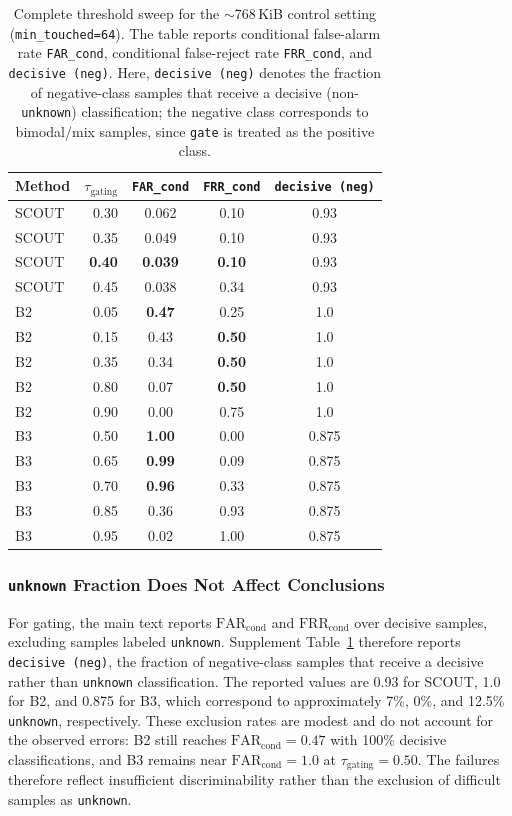 \begin{table}[!thbp]
\centering
\small
\begin{tabular}{lrccc}
\toprule
Method & $\tau_{\text{gating}}$ & \texttt{FAR\_cond} & \texttt{FRR\_cond} & \texttt{decisive (neg)} \\
\midrule
SCOUT & 0.30 & 0.062 & 0.10 & 0.93 \\
SCOUT & 0.35 & 0.049 & 0.10 & 0.93 \\
SCOUT & \textbf{0.40} & \textbf{0.039} & \textbf{0.10} & 0.93 \\
SCOUT & 0.45 & 0.038 & 0.34 & 0.93 \\
B2 & 0.05 & \textbf{0.47} & 0.25 & 1.0 \\
B2 & 0.15 & 0.43 & \textbf{0.50} & 1.0 \\
B2 & 0.35 & 0.34 & \textbf{0.50} & 1.0 \\
B2 & 0.80 & 0.07 & \textbf{0.50} & 1.0 \\
B2 & 0.90 & 0.00 & 0.75 & 1.0 \\
B3 & 0.50 & \textbf{1.00} & 0.00 & 0.875 \\
B3 & 0.65 & \textbf{0.99} & 0.09 & 0.875 \\
B3 & 0.70 & \textbf{0.96} & 0.33 & 0.875 \\
B3 & 0.85 & 0.36 & 0.93 & 0.875 \\
B3 & 0.95 & 0.02 & 1.00 & 0.875 \\
\bottomrule
\end{tabular}
\caption{Complete threshold sweep for the $\sim$768\,KiB control setting (\texttt{min\_touched=64}). The table reports conditional false-alarm rate \texttt{FAR\_cond}, conditional false-reject rate \texttt{FRR\_cond}, and \texttt{decisive (neg)}. Here, \texttt{decisive (neg)} denotes the fraction of negative-class samples that receive a decisive (non-\texttt{unknown}) classification; the negative class corresponds to bimodal/mix samples, since \texttt{gate} is treated as the positive class.}
\label{tab:c5-1}
\end{table}

\subsubsection{\texttt{unknown} Fraction Does Not Affect Conclusions}

For gating, the main text reports $\mathrm{FAR_{cond}}$ and
$\mathrm{FRR_{cond}}$ over decisive samples, excluding samples
labeled \texttt{unknown}. Supplement Table~\ref{tab:c5-1}
therefore reports \texttt{decisive (neg)}, the fraction of
negative-class samples that receive a decisive rather than
\texttt{unknown} classification. The reported values are 0.93
for SCOUT, 1.0 for B2, and 0.875 for B3, which correspond to
approximately 7\%, 0\%, and 12.5\% \texttt{unknown},
respectively. These exclusion rates are modest and do not
account for the observed errors: B2 still reaches
$\mathrm{FAR_{cond}}=0.47$ with 100\% decisive classifications,
and B3 remains near $\mathrm{FAR_{cond}}=1.0$ at
$\tau_{\text{gating}}=0.50$. The failures therefore reflect
insufficient discriminability rather than the exclusion of
difficult samples as \texttt{unknown}.

